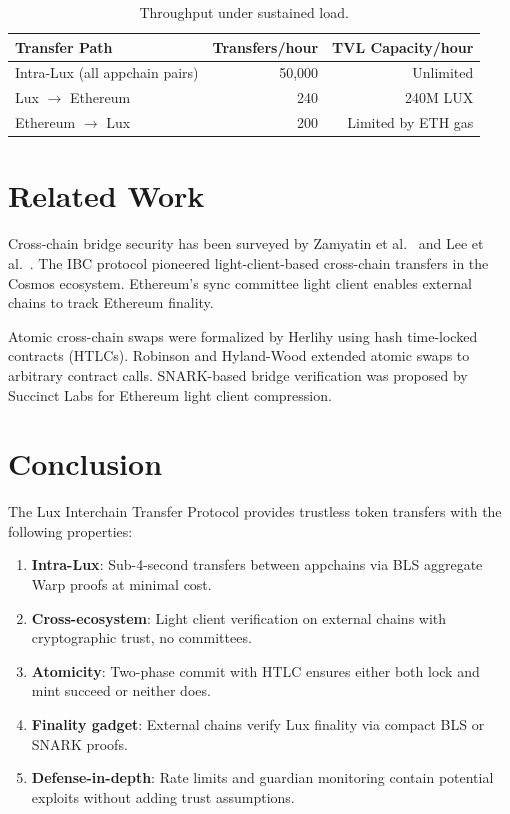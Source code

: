 \documentclass[11pt,a4paper]{article}
\begin{document}
\begin{table}[H]
\centering
\caption{Throughput under sustained load.}
\label{tab:throughput}
\begin{tabular}{lrr}
\toprule
\textbf{Transfer Path} & \textbf{Transfers/hour} & \textbf{TVL Capacity/hour} \\
\midrule
Intra-Lux (all appchain pairs) & 50,000 & Unlimited \\
Lux $\to$ Ethereum & 240 & 240M LUX \\
Ethereum $\to$ Lux & 200 & Limited by ETH gas \\
\bottomrule
\end{tabular}
\end{table}

\section{Related Work}\label{sec:related}

Cross-chain bridge security has been surveyed by Zamyatin et al.\ \cite{zamyatin2021bridge} and Lee et al.\ \cite{lee2023bridge}. The IBC protocol \cite{goes2020ibc} pioneered light-client-based cross-chain transfers in the Cosmos ecosystem. Ethereum's sync committee light client \cite{ethereumlc2022} enables external chains to track Ethereum finality.

Atomic cross-chain swaps were formalized by Herlihy \cite{herlihy2018atomic} using hash time-locked contracts (HTLCs). Robinson and Hyland-Wood \cite{robinson2022crosschain} extended atomic swaps to arbitrary contract calls. SNARK-based bridge verification was proposed by Succinct Labs \cite{succinct2023} for Ethereum light client compression.

\section{Conclusion}\label{sec:conclusion}

The Lux Interchain Transfer Protocol provides trustless token transfers with the following properties:

\begin{enumerate}
    \item \textbf{Intra-Lux}: Sub-4-second transfers between appchains via BLS aggregate Warp proofs at minimal cost.
    \item \textbf{Cross-ecosystem}: Light client verification on external chains with cryptographic trust, no committees.
    \item \textbf{Atomicity}: Two-phase commit with HTLC ensures either both lock and mint succeed or neither does.
    \item \textbf{Finality gadget}: External chains verify Lux finality via compact BLS or SNARK proofs.
    \item \textbf{Defense-in-depth}: Rate limits and guardian monitoring contain potential exploits without adding trust assumptions.
\end{enumerate}
\end{document}
